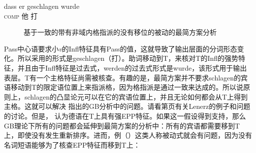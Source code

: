 \ea
\gll dass          er geschlagen wurde\\
     \textsc{comp} 他 打          \passivepst{}\\
\z
\begin{figure}
\caption{\label{fig-passive-schlagen-mp}基于一致的带有非域内格指派的没有移位的被动的最简方案分析}
\end{figure}%
Pass中心语要求小\emph{v}的Infl特征具有Pass的值，这就导致了输出层面的分词形态变化。所以采用的形式是geschlagen（打）。助词移动到T，来核对T的Infl的强势特征，并且由于Infl特征是过去式，werden的过去式形式是wurde，该形式用于输出表层。T有一个主格特征尚需被核查。有趣的是，最简方案并不要求schlagen的宾语移动到T的限定语位置上来指派格，因为格指派是通过一致来达成的。所以说原则上，schlagen的凸显论元可以在它的宾语位置上，并且无论如何都会从T上得到主格。这就可以解决 \citet[\S~4.4.3]{Lenerz77}指出的GB分析中的问题。请看第\pageref{ex-passive-German-no-movement}页有关Lenerz的例子和问题的讨论。但是， \citet[]{Adger2003a}认为德语在T上具有强EPP特征。如果这一假设得到支持，那么GB理论下所有的问题都会延伸到最简方案的分析中：所有的宾语都需要移到T上，即使没有发生重新排序。进而，例（）这类人称被动式就会有问题，因为没有名词短语能够为了核查EPP特征而移到T上：

